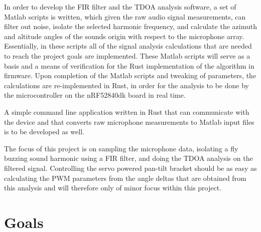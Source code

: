 \documentclass[a4paper]{article}
\begin{document}
In order to develop the FIR filter and the TDOA analysis software, a set of Matlab \cite{matlab} scripts is written, which given the raw audio signal measurements, can filter out noise, isolate the selected harmonic frequency, and calculate the azimuth and altitude angles of the sounds origin with respect to the microphone array. Essentially, in these scripts all of the signal analysis calculations that are needed to reach the project goals are implemented. These Matlab scripts will serve as a basis and a means of verification for the Rust implementation of the algorithm in firmware. Upon completion of the Matlab scripts and tweaking of parameters, the calculations are re-implemented in Rust, in order for the analysis to be done by the microcontroller on the nRF52840dk board in real time.

A simple command line application written in Rust that can communicate with the device and that converts raw microphone measurements to Matlab input files is to be developed as well.

The focus of this project is on sampling the microphone data, isolating a fly buzzing sound harmonic using a FIR filter, and doing the TDOA analysis on the filtered signal. Controlling the servo powered pan-tilt bracket should be as easy as calculating the PWM parameters from the angle deltas that are obtained from this analysis and will therefore only of minor focus within this project. 

\section{Goals}
\end{document}
